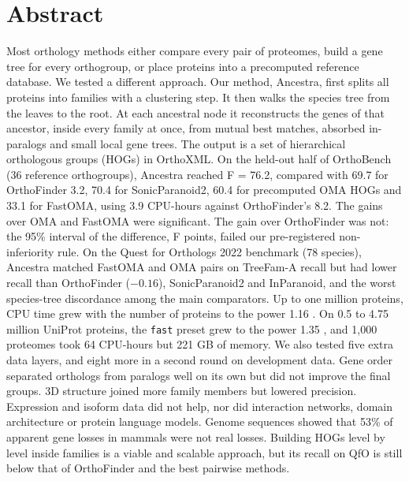 \section*{Abstract}
Most orthology methods either compare every pair of proteomes, build a gene tree for every orthogroup, or place proteins into a precomputed reference database. We tested a different approach. Our method, Ancestra, first splits all proteins into families with a clustering step. It then walks the species tree from the leaves to the root. At each ancestral node it reconstructs the genes of that ancestor, inside every family at once, from mutual best matches, absorbed in-paralogs and small local gene trees. The output is a set of hierarchical orthologous groups (HOGs) in OrthoXML. On the held-out half of OrthoBench (36 reference orthogroups), Ancestra reached F = 76.2, compared with 69.7 for OrthoFinder 3.2, 70.4 for SonicParanoid2, 60.4 for precomputed OMA HOGs and 33.1 for FastOMA, using 3.9 CPU-hours against OrthoFinder's 8.2. The gains over OMA and FastOMA were significant. The gain over OrthoFinder was not: the 95\% interval of the difference,  F points, failed our pre-registered non-inferiority rule. On the Quest for Orthologs 2022 benchmark (78 species), Ancestra matched FastOMA and OMA pairs on TreeFam-A recall but had lower recall than OrthoFinder ($-0.16$), SonicParanoid2 and InParanoid, and the worst species-tree discordance among the main comparators. Up to one million proteins, CPU time grew with the number of proteins to the power 1.16 . On 0.5 to 4.75 million UniProt proteins, the \texttt{fast} preset grew to the power 1.35 , and 1,000 proteomes took 64 CPU-hours but 221 GB of memory. We also tested five extra data layers, and eight more in a second round on development data. Gene order separated orthologs from paralogs well on its own but did not improve the final groups. 3D structure joined more family members but lowered precision. Expression and isoform data did not help, nor did interaction networks, domain architecture or protein language models. Genome sequences showed that 53\% of apparent gene losses in mammals were not real losses. Building HOGs level by level inside families is a viable and scalable approach, but its recall on QfO is still below that of OrthoFinder and the best pairwise methods.

